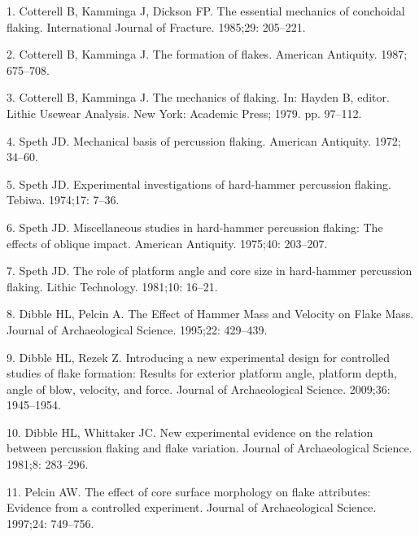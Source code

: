 \documentclass[10pt,letterpaper]{article}
\newenvironment{cslreferences}%
  {}%
  {\par}
\begin{document}
\hypertarget{refs}{}
\begin{cslreferences}
\leavevmode\hypertarget{ref-cotterell_essential_1985}{}%
1. Cotterell B, Kamminga J, Dickson FP. The essential mechanics of
conchoidal flaking. International Journal of Fracture. 1985;29:
205--221.

\leavevmode\hypertarget{ref-cotterell_formation_1987}{}%
2. Cotterell B, Kamminga J. The formation of flakes. American Antiquity.
1987; 675--708.

\leavevmode\hypertarget{ref-cotterell_mechanics_1979}{}%
3. Cotterell B, Kamminga J. The mechanics of flaking. In: Hayden B,
editor. Lithic Usewear Analysis. New York: Academic Press; 1979. pp.
97--112.

\leavevmode\hypertarget{ref-speth_mechanical_1972}{}%
4. Speth JD. Mechanical basis of percussion flaking. American Antiquity.
1972; 34--60.

\leavevmode\hypertarget{ref-speth_experimental_1974}{}%
5. Speth JD. Experimental investigations of hard-hammer percussion
flaking. Tebiwa. 1974;17: 7--36.

\leavevmode\hypertarget{ref-speth_miscellaneous_1975}{}%
6. Speth JD. Miscellaneous studies in hard-hammer percussion flaking:
The effects of oblique impact. American Antiquity. 1975;40: 203--207.

\leavevmode\hypertarget{ref-speth_role_1981}{}%
7. Speth JD. The role of platform angle and core size in hard-hammer
percussion flaking. Lithic Technology. 1981;10: 16--21.

\leavevmode\hypertarget{ref-dibble_effect_1995}{}%
8. Dibble HL, Pelcin A. The Effect of Hammer Mass and Velocity on Flake
Mass. Journal of Archaeological Science. 1995;22: 429--439.

\leavevmode\hypertarget{ref-dibble_introducing_2009-1}{}%
9. Dibble HL, Rezek Z. Introducing a new experimental design for
controlled studies of flake formation: Results for exterior platform
angle, platform depth, angle of blow, velocity, and force. Journal of
Archaeological Science. 2009;36: 1945--1954.

\leavevmode\hypertarget{ref-dibble_new_1981-1}{}%
10. Dibble HL, Whittaker JC. New experimental evidence on the relation
between percussion flaking and flake variation. Journal of
Archaeological Science. 1981;8: 283--296.

\leavevmode\hypertarget{ref-pelcin_effect_1997}{}%
11. Pelcin AW. The effect of core surface morphology on flake
attributes: Evidence from a controlled experiment. Journal of
Archaeological Science. 1997;24: 749--756.


\end{cslreferences}
\end{document}
